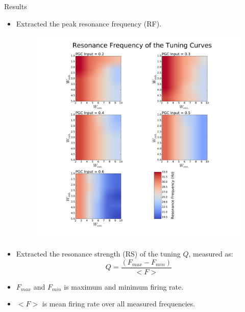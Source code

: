 \documentclass[final,hyperref={pdfpagelabels=false}]{beamer}
\begin{document}
\begin{frame}{}
\begin{columns}[t]
\begin{column}{.48\linewidth}
\begin{block}{Results}
\begin{itemize}
\item Extracted the peak resonance frequency (RF).
\begin{figure}
\center
\includegraphics[scale=0.55]{images/Contour_plot_tuning_frequency}
\end{figure}
\item Extracted the resonance strength (RS) of the tuning $Q$, measured as:
\begin{equation}
Q = \frac{(F_{max} - F_{min})}{<F>}
\end{equation}
\item $F_{max}$ and $F_{min}$ is maximum and minimum firing rate.
\item $<F>$ is mean firing rate over all measured frequencies.
\begin{figure}
\center

\end{figure}
\end{itemize}
\end{block}
\end{column}
\end{columns}
\end{frame}
\end{document}
